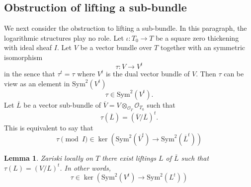 \documentclass[12pt,twoside]{book}
\theoremstyle{plain}
\newtheorem{lemma}[lemma]{Lemma}
\theoremstyle{definition}
\theoremstyle{remark}
\numberwithin{equation}{section}
\begin{document}
\subsection{Obstruction of lifting a sub-bundle}
We next consider the obstruction to lifting a sub-bundle. In this paragraph, the logarithmic structures play no role. Let $\iota:T_0\rightarrow T$ be a square zero thickening with ideal sheaf $I$. Let $V$ be a vector bundle over $T$ together with an symmetric isomorphism
\[\tau\colon V\rightarrow V^t\]
in the sence that $\tau^t=\tau$ where $V^t$ is the dual vector bundle of $V$. Then $\tau$ can be view as an element in $\mathrm{Sym}^2(V^t)$
\[\tau\in\mathrm{Sym}^2(V^t).\]
Let $\overline{L}$ be a vector sub-bundle of $\overline{V}=V\otimes_{\mathcal O_T} \mathcal O_{T_0}$ such that
\[\tau(\overline{L}) = (\overline{V}/\overline{L})^t.\]
This is equivalent to say that
\[\tau \pmod{I} \in \ker\left( \mathrm{Sym}^2(\overline{V}^t) \rightarrow \mathrm{Sym}^2(\overline{L}^t) \right)\]
\begin{lemma}
Zariski locally on $T$ there exist liftings $L$ of $\overline{L}$ such that $\tau(L)=(V/L)^t$. In other words,
\[\tau \in \ker\left( \mathrm{Sym}^2(V^t) \rightarrow \mathrm{Sym}^2(L^t) \right)\]
\end{lemma}
\end{document}
